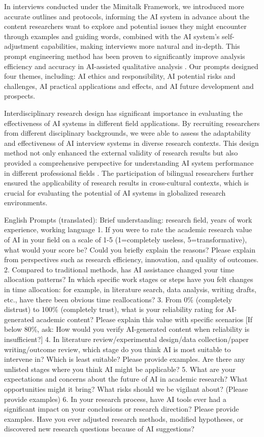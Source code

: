 \documentclass[sigchi,nonacm,manuscript]{acmart}
\begin{document}
In interviews conducted under the Mimitalk Framework, we introduced more accurate outlines and protocols, informing the AI system in advance about the content researchers want to explore and potential issues they might encounter through examples and guiding words, combined with the AI system's self-adjustment capabilities, making interviews more natural and in-depth. This prompt engineering method has been proven to significantly improve analysis efficiency and accuracy in AI-assisted qualitative analysis \citep{akmanHumanResearcherVs2025}. Our prompts designed four themes, including: AI ethics and responsibility, AI potential risks and challenges, AI practical applications and effects, and AI future development and prospects.

Interdisciplinary research design has significant importance in evaluating the effectiveness of AI systems in different field applications. By recruiting researchers from different disciplinary backgrounds, we were able to assess the adaptability and effectiveness of AI interview systems in diverse research contexts. This design method not only enhanced the external validity of research results but also provided a comprehensive perspective for understanding AI system performance in different professional fields \citep{stokolsScienceTransdisciplinaryAction2006}. The participation of bilingual researchers further ensured the applicability of research results in cross-cultural contexts, which is crucial for evaluating the potential of AI systems in globalized research environments.

English Prompts (translated): {Brief understanding: research field, years of work experience, working language
1. If you were to rate the academic research value of AI in your field on a scale of 1-5 (1=completely useless, 5=transformative), what would your score be? Could you briefly explain the reasons? Please explain from perspectives such as research efficiency, innovation, and quality of outcomes.
2. Compared to traditional methods, has AI assistance changed your time allocation patterns? In which specific work stages or steps have you felt changes in time allocation: for example, in literature search, data analysis, writing drafts, etc., have there been obvious time reallocations?
3. From 0\% (completely distrust) to 100\% (completely trust), what is your reliability rating for AI-generated academic content? Please explain this value with specific scenarios [If below 80\%, ask: How would you verify AI-generated content when reliability is insufficient?]
4. In literature review/experimental design/data collection/paper writing/outcome review, which stage do you think AI is most suitable to intervene in? Which is least suitable? Please provide examples. Are there any unlisted stages where you think AI might be applicable?
5. What are your expectations and concerns about the future of AI in academic research? What opportunities might it bring? What risks should we be vigilant about? (Please provide examples)
6. In your research process, have AI tools ever had a significant impact on your conclusions or research direction? Please provide examples. Have you ever adjusted research methods, modified hypotheses, or discovered new research questions because of AI suggestions?}
\end{document}
